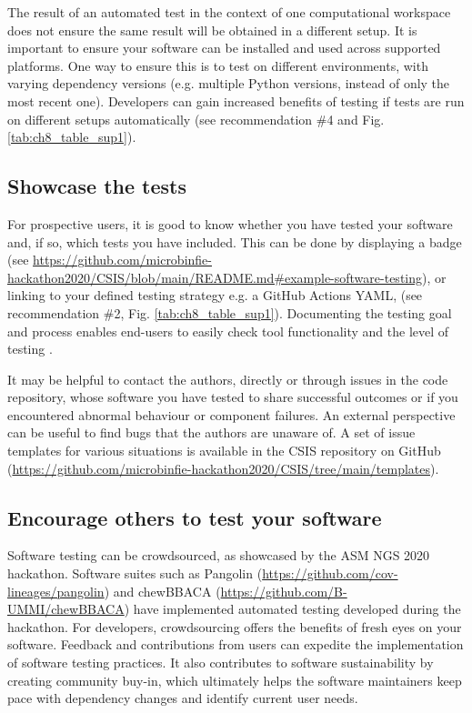 The result of an automated test in the context of one computational workspace does not ensure the same result will be obtained in a different setup. It is important to ensure your software can be installed and used across supported platforms. One way to ensure this is to test on different environments, with varying dependency versions (e.g. multiple Python versions, instead of only the most recent one). Developers can gain increased benefits of testing if tests are run on different setups automatically (see recommendation \#4 and Fig. \ref{tab:ch8_table_sup1}).

\subsection{Showcase the tests}

For prospective users, it is good to know whether you have tested your software and, if so, which tests you have included. This can be done by displaying a badge \cite{trockman_adding_2018} (see \url{https://github.com/microbinfie-hackathon2020/CSIS/blob/main/README.md#example-software-testing}), or linking to your defined testing strategy e.g. a GitHub Actions YAML, (see recommendation \#2, Fig. \ref{tab:ch8_table_sup1}). Documenting the testing goal and process enables end-users to easily check tool functionality and the level of testing \cite{karimzadeh_top_2018}.

It may be helpful to contact the authors, directly or through issues in the code repository, whose software you have tested to share successful outcomes or if you encountered abnormal behaviour or component failures. An external perspective can be useful to find bugs that the authors are unaware of. A set of issue templates for various situations is available in the CSIS repository on GitHub (\url{https://github.com/microbinfie-hackathon2020/CSIS/tree/main/templates}).

\subsection{Encourage others to test your software}

Software testing can be crowdsourced, as showcased by the ASM NGS 2020 hackathon. Software suites such as Pangolin (\url{https://github.com/cov-lineages/pangolin}) \cite{otoole_assignment_2021} and chewBBACA (\url{https://github.com/B-UMMI/chewBBACA}) \cite{silva_chewbbaca_nodate} have implemented automated testing developed during the hackathon. For developers, crowdsourcing offers the benefits of fresh eyes on your software. Feedback and contributions from users can expedite the implementation of software testing practices. It also contributes to software sustainability by creating community buy-in, which ultimately helps the software maintainers keep pace with dependency changes and identify current user needs.

